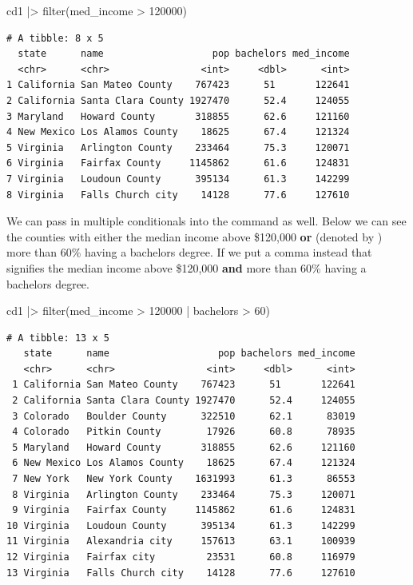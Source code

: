 \documentclass[
  letterpaper,
  DIV=11,
  numbers=noendperiod]{scrreprt}
\newenvironment{Shaded}{\begin{snugshade}}{\end{snugshade}}
\newcommand{\DecValTok}[1]{\textcolor[rgb]{0.68,0.00,0.00}{#1}}
\newcommand{\FunctionTok}[1]{\textcolor[rgb]{0.28,0.35,0.67}{#1}}
\newcommand{\NormalTok}[1]{\textcolor[rgb]{0.00,0.23,0.31}{#1}}
\newcommand{\SpecialCharTok}[1]{\textcolor[rgb]{0.37,0.37,0.37}{#1}}
\begin{document}
\begin{Shaded}
\begin{Highlighting}[]
\NormalTok{cd1 }\SpecialCharTok{|\textgreater{}} \FunctionTok{filter}\NormalTok{(med\_income }\SpecialCharTok{\textgreater{}} \DecValTok{120000}\NormalTok{)}
\end{Highlighting}
\end{Shaded}

\begin{verbatim}
# A tibble: 8 x 5
  state      name                   pop bachelors med_income
  <chr>      <chr>                <int>     <dbl>      <int>
1 California San Mateo County    767423      51       122641
2 California Santa Clara County 1927470      52.4     124055
3 Maryland   Howard County       318855      62.6     121160
4 New Mexico Los Alamos County    18625      67.4     121324
5 Virginia   Arlington County    233464      75.3     120071
6 Virginia   Fairfax County     1145862      61.6     124831
7 Virginia   Loudoun County      395134      61.3     142299
8 Virginia   Falls Church city    14128      77.6     127610
\end{verbatim}

We can pass in multiple conditionals into the command as well. Below we
can see the counties with either the median income above \$120,000
\textbf{or} (denoted by \textbar) more than 60\% having a bachelors
degree. If we put a comma instead that signifies the median income above
\$120,000 \textbf{and} more than 60\% having a bachelors degree.

\begin{Shaded}
\begin{Highlighting}[]
\NormalTok{cd1 }\SpecialCharTok{|\textgreater{}} \FunctionTok{filter}\NormalTok{(med\_income }\SpecialCharTok{\textgreater{}} \DecValTok{120000} \SpecialCharTok{|}\NormalTok{ bachelors }\SpecialCharTok{\textgreater{}} \DecValTok{60}\NormalTok{)}
\end{Highlighting}
\end{Shaded}

\begin{verbatim}
# A tibble: 13 x 5
   state      name                   pop bachelors med_income
   <chr>      <chr>                <int>     <dbl>      <int>
 1 California San Mateo County    767423      51       122641
 2 California Santa Clara County 1927470      52.4     124055
 3 Colorado   Boulder County      322510      62.1      83019
 4 Colorado   Pitkin County        17926      60.8      78935
 5 Maryland   Howard County       318855      62.6     121160
 6 New Mexico Los Alamos County    18625      67.4     121324
 7 New York   New York County    1631993      61.3      86553
 8 Virginia   Arlington County    233464      75.3     120071
 9 Virginia   Fairfax County     1145862      61.6     124831
10 Virginia   Loudoun County      395134      61.3     142299
11 Virginia   Alexandria city     157613      63.1     100939
12 Virginia   Fairfax city         23531      60.8     116979
13 Virginia   Falls Church city    14128      77.6     127610
\end{verbatim}
\end{document}
